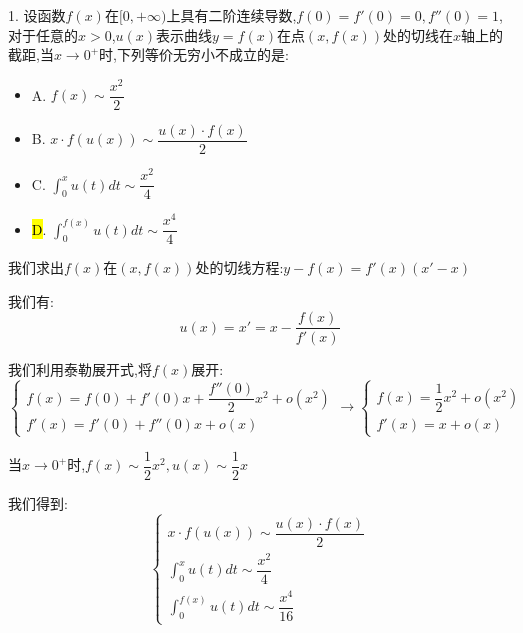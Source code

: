1. 设函数$f(x)$在$[0,+\infty)$上具有二阶连续导数,$f(0)=f'(0)=0,f''(0)=1$,对于任意的$x>0$,$u(x)$表示曲线$y=f(x)$在点$(x,f(x))$处的切线在$x$轴上的截距,当$x\rightarrow 0^{+}$时,下列等价无穷小不成立的是:  
\begin{itemize}
	\item A. $f(x)\sim \dfrac{x^2}{2}$
	\item B. $x\cdot f(u(x))\sim \dfrac{u(x)\cdot f(x)}{2}$
	\item C. $\int_{0}^{x}u(t)dt\sim \dfrac{x^2}{4}$
	\item \hl{D}. $\int_{0}^{f(x)}u(t)dt\sim \dfrac{x^4}{4}$
\end{itemize}
\begin{solution}

	我们求出$f(x)$在$(x,f(x))$处的切线方程:$y-f(x)=f'(x)(x'-x)$
	
	我们有:
	$$u(x)=x'=x-\dfrac{f(x)}{f'(x)}$$
	
	我们利用泰勒展开式,将$f(x)$展开:
	$$\left\lbrace 
	\begin{array}{l}
		f(x)=f(0)+f'(0)x+\dfrac{f''(0)}{2}x^2+o(x^2)\\
		f'(x)=f'(0)+f''(0)x+o(x)
	\end{array}
	\right. \rightarrow \left\lbrace 
	\begin{array}{l}
		f(x)=\dfrac{1}{2}x^2+o(x^2)\\
		f'(x)=x+o(x)
	\end{array}
	\right. $$
	
	当$x\rightarrow 0^{+}$时,$f(x)\sim \dfrac{1}{2}x^2,u(x)\sim \dfrac{1}{2}x$
	
	我们得到:
	$$\left\lbrace 
	\begin{array}{l}
		x\cdot f(u(x))\sim \dfrac{u(x)\cdot f(x)}{2}\\
		\int_{0}^{x}u(t)dt\sim \dfrac{x^2}{4}\\
		\int_{0}^{f(x)}u(t)dt\sim \dfrac{x^4}{16}
	\end{array}
	\right. $$
\end{solution}

